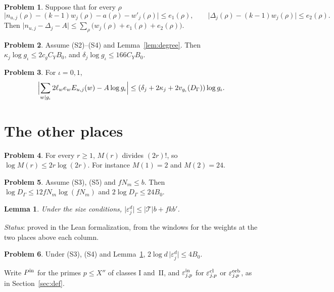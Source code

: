 \documentclass[reqno]{amsart}
\theoremstyle{definition}
\newtheorem{problem}{Problem}[section]
\theoremstyle{plain}
\newtheorem{lemma}[theorem]{Lemma}
\theoremstyle{remark}
\newcommand{\Tc}{\mathcal T}
\begin{document}
\begin{problem}\label{pr:degree-assembly}
Suppose that for every \(\rho\)
\[
 \bigl\lvert n_{u,j}(\rho)-(k-1)w_j(\rho)-a(\rho)-w'_j(\rho)\bigr\rvert\le e_1(\rho),\qquad
 \bigl\lvert\Delta_j(\rho)-(k-1)w_j(\rho)\bigr\rvert\le e_2(\rho).
\]
Then \(\lvert n_{u,j}-\Delta_j-A\rvert\le\sum_\rho\bigl(w_j(\rho)+e_1(\rho)+e_2(\rho)\bigr)\).
\end{problem}

\begin{problem}\label{pr:kappa}
Assume (S2)--(S4) and Lemma~\ref{lem:degree}.  Then \(\kappa_j\log g_\iota\le2c_gC_YB_0\), and \(\delta_j\log g_\iota\le166C_YB_0\).
\end{problem}

\begin{problem}\label{pr:level-clause}
For \(\iota=0,1\),
\[
 \Bigl\lvert\sum_{w\mid g_\iota}2\ell_we_wE_{u,j}(w)-A\log g_\iota\Bigr\rvert\le(\delta_j+2\kappa_j+2v_{g_\iota}(D_\Gamma))\log g_\iota .
\]
\end{problem}

\section{The other places}\label{sec:other}

\begin{problem}\label{pr:minkowski}
For every \(r\ge1\), \(M(r)\) divides \((2r)!\), so \(\log M(r)\le2r\log(2r)\).  For instance \(M(1)=2\) and \(M(2)=24\).
\end{problem}

\begin{problem}\label{pr:DGamma}
Assume (S3), (S5) and \(fN_m\le b\).  Then \(\log D_\Gamma\le12fN_m\log(fN_m)\) and \(2\log D_\Gamma\le24B_0\).
\end{problem}

\begin{lemma}\label{lem:ramified}
Under the size conditions, \(\lvert\varepsilon^d_j\rvert\le\lvert\Tc\rvert b+fkb'\).
\end{lemma}
\noindent\emph{Status}: proved in the Lean formalization, from the windows for the weights at the two places above each column.

\begin{problem}\label{pr:ramified}
Under (S3), (S4) and Lemma~\ref{lem:ramified}, \(2\log d\,\lvert\varepsilon^d_j\rvert\le4B_0\).
\end{problem}

Write \(P^{\rm in}\) for the primes \(p\le X''\) of classes I and~II, and \(\varepsilon^{\rm in}_{j,p}\) for \(\varepsilon^{\rm cl}_{j,p}\) or \(\varepsilon^{\rm orb}_{j,p}\), as in Section~\ref{sec:def}.
\end{document}
